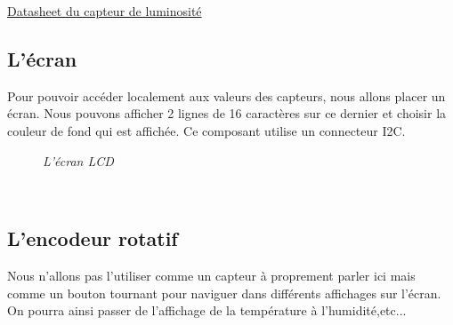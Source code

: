 \href{https://github.com/SeeedDocument/Grove_Light_Sensor/raw/master/res/LS06-M%CE%A65_datasheet.pdf}{Datasheet du capteur de luminosité}

\subsection{L'écran}

Pour pouvoir accéder localement aux valeurs des capteurs, nous allons placer un écran.
Nous pouvons afficher 2 lignes de 16 caractères sur ce dernier et choisir la couleur de fond qui est affichée. Ce composant utilise un connecteur I2C.\\

\begin{figure}[H]
\begin{center}
\end{center}
	\caption{ \textit{L'écran LCD}}
\end{figure}\\

\subsection{L'encodeur rotatif}

Nous n'allons pas l'utiliser comme un capteur à proprement parler ici mais comme un bouton tournant pour naviguer dans différents affichages sur l'écran. On pourra ainsi passer de l'affichage de la température à l'humidité,etc...\\

